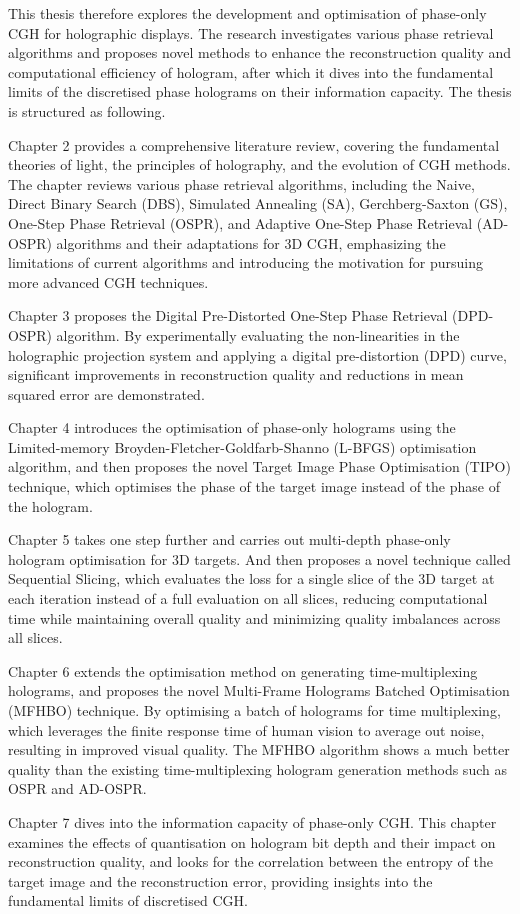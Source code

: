 This thesis therefore explores the development and optimisation of phase-only CGH for holographic displays. The research investigates various phase retrieval algorithms and proposes novel methods to enhance the reconstruction quality and computational efficiency of hologram, after which it dives into the fundamental limits of the discretised phase holograms on their information capacity. The thesis is structured as following.

Chapter 2 provides a comprehensive literature review, covering the fundamental theories of light, the principles of holography, and the evolution of CGH methods. The chapter reviews various phase retrieval algorithms, including the Naive, Direct Binary Search (DBS), Simulated Annealing (SA), Gerchberg-Saxton (GS), One-Step Phase Retrieval (OSPR), and Adaptive One-Step Phase Retrieval (AD-OSPR) algorithms and their adaptations for 3D CGH, emphasizing the limitations of current algorithms and introducing the motivation for pursuing more advanced CGH techniques.

Chapter 3 proposes the Digital Pre-Distorted One-Step Phase Retrieval (DPD-OSPR) algorithm. By experimentally evaluating the non-linearities in the holographic projection system and applying a digital pre-distortion (DPD) curve, significant improvements in reconstruction quality and reductions in mean squared error are demonstrated.

Chapter 4 introduces the optimisation of phase-only holograms using the Limited-memory Broyden-Fletcher-Goldfarb-Shanno (L-BFGS) optimisation algorithm, and then proposes the novel Target Image Phase Optimisation (TIPO) technique, which optimises the phase of the target image instead of the phase of the hologram.

Chapter 5 takes one step further and carries out multi-depth phase-only hologram optimisation for 3D targets. And then proposes a novel technique called Sequential Slicing, which evaluates the loss for a single slice of the 3D target at each iteration instead of a full evaluation on all slices, reducing computational time while maintaining overall quality and minimizing quality imbalances across all slices.

Chapter 6 extends the optimisation method on generating time-multiplexing holograms, and proposes the novel Multi-Frame Holograms Batched Optimisation (MFHBO) technique. By optimising a batch of holograms for time multiplexing, which leverages the finite response time of human vision to average out noise, resulting in improved visual quality. The MFHBO algorithm shows a much better quality than the existing time-multiplexing hologram generation methods such as OSPR and AD-OSPR.

Chapter 7 dives into the information capacity of phase-only CGH. This chapter examines the effects of quantisation on hologram bit depth and their impact on reconstruction quality, and looks for the correlation between the entropy of the target image and the reconstruction error, providing insights into the fundamental limits of discretised CGH.
